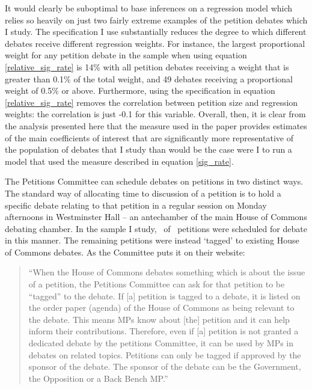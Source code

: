 \documentclass[12pt]{article}
\makeatletter
\renewcommand{\section}{\@startsection{section}{1}{0mm}{-\baselineskip}{0.20\baselineskip}{\centering\normalfont\normalsize\scshape}}
\makeatother
\begin{document}
It would clearly be suboptimal to base inferences on a regression model which relies so heavily on just two fairly extreme examples of the petition debates which I study. The specification I use substantially reduces the degree to which different debates receive different regression weights. For instance, the largest proportional weight for any petition debate in the sample when using equation \ref{relative_sig_rate} is 14\% with all petition debates receiving a weight that is greater than 0.1\% of the total weight, and 49 debates receiving a proportional weight of 0.5\% or above. Furthermore, using the specification in equation \ref{relative_sig_rate} removes the correlation between petition size and regression weights: the correlation is just -0.1 for this variable. Overall, then, it is clear from the analysis presented here that the measure used in the paper provides estimates of the main coefficients of interest that are significantly more representative of the population of debates that I study than would be the case were I to run a model that used the measure described in equation \ref{sig_rate}.

\clearpage

\section{`Tagged' petition debates}\label{app:tagged_petition_debates}

The Petitions Committee can schedule debates on petitions in two distinct ways. The standard way of allocating time to discussion of a petition is to hold a specific debate relating to that petition in a regular session on Monday afternoons in Westminster Hall -- an antechamber of the main House of Commons debating chamber. In the sample I study,   \unskip\ of \unskip\ petitions were scheduled for debate in this manner. The remaining petitions were instead `tagged' to existing House of Commons debates. As the Committee puts it on their website: 

\begin{quote}
``When the House of Commons debates something which is about the issue of a petition, the Petitions Committee can ask for that petition to be ``tagged'' to the debate. If [a] petition is tagged to a debate, it is listed on the order paper (agenda) of the House of Commons as being relevant to the debate. This means MPs know about [the] petition and it can help inform their contributions. Therefore, even if [a] petition is not granted a dedicated debate by the petitions Committee, it can be used by MPs in debates on related topics. Petitions can only be tagged if approved by the sponsor of the debate. The sponsor of the debate can be the Government, the Opposition or a Back Bench MP.'' \citep{committeeWebsite}
\end{quote}
\end{document}
